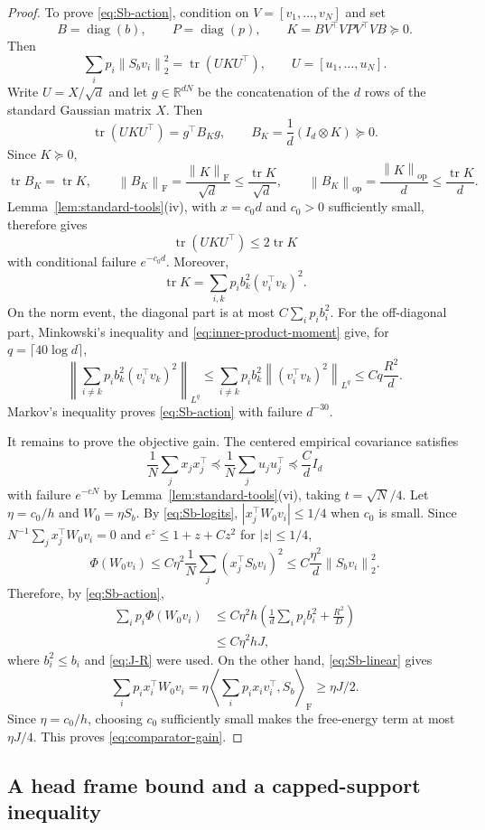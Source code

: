 \documentclass[11pt]{article}
\theoremstyle{remark}
\newcommand{\R}{\mathbb R}
\newcommand{\ip}[2]{\left\langle #1,#2\right\rangle}
\newcommand{\norm}[1]{\left\lVert #1\right\rVert}
\newcommand{\op}{\mathrm{op}}
\newcommand{\F}{\mathrm{F}}
\newcommand{\1}{\mathbf 1}
\newcommand{\diag}{\operatorname{diag}}
\newcommand{\tr}{\operatorname{tr}}
\begin{document}
\begin{proof}
To prove \eqref{eq:Sb-action}, condition on
$V=[v_1,\ldots,v_N]$ and set
\[
 B=\diag(b),
 \qquad
 P=\diag(p),
 \qquad
 K=B V^\top V P V^\top V B\succeq0.
\]
Then
\[
 \sum_i p_i\norm{S_bv_i}_2^2=\tr(UKU^\top),
 \qquad U=[u_1,\ldots,u_N].
\]
Write $U=X/\sqrt d$ and let $g\in\R^{dN}$ be the concatenation of
the $d$ rows of the standard Gaussian matrix $X$.  Then
\[
 \tr(UKU^\top)
 =g^\top B_Kg,
 \qquad
 B_K=\frac1d(I_d\otimes K)\succeq0.
\]
Since $K\succeq0$,
\[
 \tr B_K=\tr K,\qquad
 \norm{B_K}_{\F}
 =\frac{\norm K_{\F}}{\sqrt d}
 \leq\frac{\tr K}{\sqrt d},\qquad
 \norm{B_K}_{\op}
 =\frac{\norm K_{\op}}d
 \leq\frac{\tr K}d.
\]
Lemma~\ref{lem:standard-tools}(iv), with $x=c_0d$ and $c_0>0$
sufficiently small, therefore gives
\[
 \tr(UKU^\top)\leq2\tr K
\]
with conditional failure $e^{-c_0d}$.  Moreover,
\[
 \tr K=\sum_{i,k}p_ib_k^2(v_i^\top v_k)^2.
\]
On the norm event, the diagonal part is at most
$C\sum_i p_ib_i^2$.  For the off-diagonal part, Minkowski's inequality
and \eqref{eq:inner-product-moment} give, for
$q=\lceil40\log d\rceil$,
\[
 \left\|\sum_{i\neq k}p_ib_k^2(v_i^\top v_k)^2\right\|_{L^q}
 \leq\sum_{i\neq k}p_ib_k^2
 \norm{(v_i^\top v_k)^2}_{L^q}
 \leq Cq\frac{R^2}{d}.
\]
Markov's inequality proves \eqref{eq:Sb-action} with failure
$d^{-30}$.

It remains to prove the objective gain.  The centered empirical
covariance satisfies
\[
 \frac1N\sum_jx_jx_j^\top
 \preceq\frac1N\sum_ju_ju_j^\top
 \preceq\frac C d I_d
\]
with failure $e^{-cN}$ by Lemma~\ref{lem:standard-tools}(vi), taking $t=\sqrt N/4$.
Let $\eta=c_0/h$ and $W_0=\eta S_b$.  By
\eqref{eq:Sb-logits}, $|x_j^\top W_0v_i|\leq1/4$ when $c_0$ is small.
Since $N^{-1}\sum_jx_j^\top W_0v_i=0$ and
$e^z\leq1+z+Cz^2$ for $|z|\leq1/4$,
\[
 \Phi(W_0v_i)
 \leq C\eta^2\frac1N\sum_j(x_j^\top S_bv_i)^2
 \leq C\frac{\eta^2}{d}\norm{S_bv_i}_2^2.
\]
Therefore, by \eqref{eq:Sb-action},
\begin{align*}
 \sum_i p_i\Phi(W_0v_i)
 &\leq C\eta^2h
 \left(\frac1d\sum_i p_ib_i^2+\frac{R^2}{D}\right)\\
 &\leq C\eta^2hJ,
\end{align*}
where $b_i^2\leq b_i$ and \eqref{eq:J-R} were used.  On the other hand,
\eqref{eq:Sb-linear} gives
\[
 \sum_i p_ix_i^\top W_0v_i
 =\eta\ip{\sum_i p_ix_iv_i^\top}{S_b}_{\F}
 \geq\eta J/2.
\]
Since $\eta=c_0/h$, choosing $c_0$ sufficiently small makes the
free-energy term at most $\eta J/4$.  This proves
\eqref{eq:comparator-gain}.
\end{proof}

\subsection{A head frame bound and a capped-support inequality}
\end{document}
